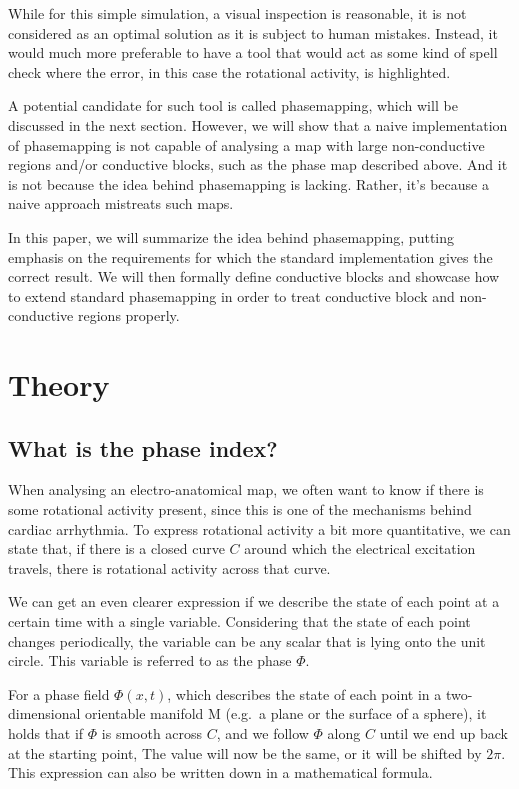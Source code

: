 \documentclass[twocolumn]{article}
\begin{document}
While for this simple simulation, a visual inspection is reasonable, it
is not considered as an optimal solution as it is subject to human
mistakes. Instead, it would much more preferable to have a tool that
would act as some kind of spell check where the error, in this case the
rotational activity, is highlighted.

A potential candidate for such tool is called phasemapping, which will
be discussed in the next section. However, we will show that a naive
implementation of phasemapping is not capable of analysing a map with
large non-conductive regions and/or conductive blocks, such as the phase
map described above. And it is not because the idea behind phasemapping
is lacking. Rather, it's because a naive approach mistreats such maps.

In this paper, we will summarize the idea behind phasemapping, putting
emphasis on the requirements for which the standard implementation gives
the correct result. We will then formally define conductive blocks and
showcase how to extend standard phasemapping in order to treat
conductive block and non-conductive regions properly.


\section{Theory}\label{theory}

\subsection{What is the phase index?}\label{what-is-the-phase-index}

When analysing an electro-anatomical map, we often want to know if there
is some rotational activity present, since this is one of the mechanisms
behind cardiac arrhythmia. To express rotational activity a bit more
quantitative, we can state that, if there is a closed curve \(C\) around
which the electrical excitation travels, there is rotational activity
across that curve.

We can get an even clearer expression if we describe the state of each
point at a certain time with a single variable. Considering that the
state of each point changes periodically, the variable can be any scalar
that is lying onto the unit circle. This variable is referred to as the
phase \(\Phi\).

For a phase field \(\Phi(x, t)\), which describes the state of each
point in a two-dimensional orientable manifold M (e.g.~a plane or the
surface of a sphere), it holds that if \(\Phi\) is smooth across \(C\),
and we follow \(\Phi\) along \(C\) until we end up back at the starting
point, The value will now be the same, or it will be shifted by
\(2\pi\). This expression can also be written down in a mathematical
formula.
\end{document}
